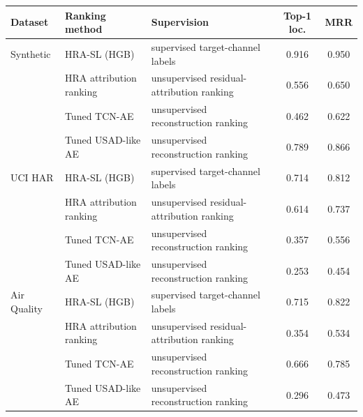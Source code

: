 \begin{tabularx}{\textwidth}{ll>{\raggedright\arraybackslash}Xcc}
\toprule
Dataset & Ranking method & Supervision & Top-1 loc. & MRR \\
\midrule
Synthetic & HRA-SL (HGB) & supervised target-channel labels & 0.916 & 0.950 \\
 & HRA attribution ranking & unsupervised residual-attribution ranking & 0.556 & 0.650 \\
 & Tuned TCN-AE & unsupervised reconstruction ranking & 0.462 & 0.622 \\
 & Tuned USAD-like AE & unsupervised reconstruction ranking & 0.789 & 0.866 \\
\addlinespace[2pt]
UCI HAR & HRA-SL (HGB) & supervised target-channel labels & 0.714 & 0.812 \\
 & HRA attribution ranking & unsupervised residual-attribution ranking & 0.614 & 0.737 \\
 & Tuned TCN-AE & unsupervised reconstruction ranking & 0.357 & 0.556 \\
 & Tuned USAD-like AE & unsupervised reconstruction ranking & 0.253 & 0.454 \\
\addlinespace[2pt]
Air Quality & HRA-SL (HGB) & supervised target-channel labels & 0.715 & 0.822 \\
 & HRA attribution ranking & unsupervised residual-attribution ranking & 0.354 & 0.534 \\
 & Tuned TCN-AE & unsupervised reconstruction ranking & 0.666 & 0.785 \\
 & Tuned USAD-like AE & unsupervised reconstruction ranking & 0.296 & 0.473 \\
\bottomrule
\end{tabularx}
